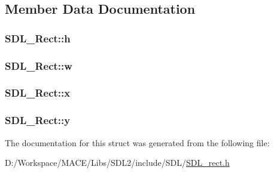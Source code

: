 \subsection{Member Data Documentation}
\subsubsection[{\texorpdfstring{h}{h}}]{ S\+D\+L\+\_\+\+Rect\+::h}\hypertarget{struct_s_d_l___rect_a0a17d46b320af8063b746153348edd72}{}\label{struct_s_d_l___rect_a0a17d46b320af8063b746153348edd72}
\subsubsection[{\texorpdfstring{w}{w}}]{ S\+D\+L\+\_\+\+Rect\+::w}\hypertarget{struct_s_d_l___rect_a56b7be5738fb6fab86881534a814c45e}{}\label{struct_s_d_l___rect_a56b7be5738fb6fab86881534a814c45e}
\subsubsection[{\texorpdfstring{x}{x}}]{ S\+D\+L\+\_\+\+Rect\+::x}\hypertarget{struct_s_d_l___rect_a85418d94621dd6855805c4b5c7bf6482}{}\label{struct_s_d_l___rect_a85418d94621dd6855805c4b5c7bf6482}
\subsubsection[{\texorpdfstring{y}{y}}]{ S\+D\+L\+\_\+\+Rect\+::y}\hypertarget{struct_s_d_l___rect_a822694af8ddca5fd0d5d94e47106ab85}{}\label{struct_s_d_l___rect_a822694af8ddca5fd0d5d94e47106ab85}


The documentation for this struct was generated from the following file\+:\begin{DoxyCompactItemize}
\item 
D\+:/\+Workspace/\+M\+A\+C\+E/\+Libs/\+S\+D\+L2/include/\+S\+D\+L/\hyperlink{_s_d_l__rect_8h}{S\+D\+L\+\_\+rect.\+h}\end{DoxyCompactItemize}
